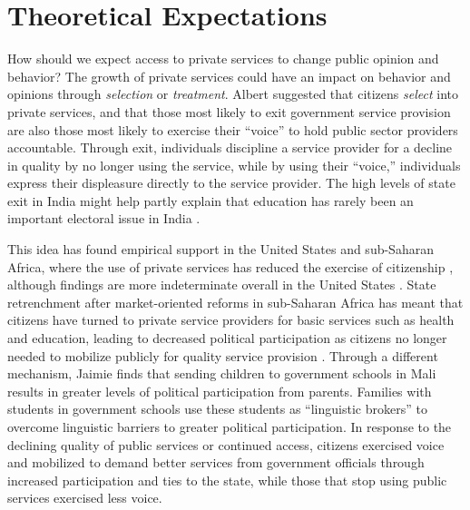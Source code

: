 \documentclass[hidelinks, 12pt, titlepage]{article}
\begin{document}
\section*{Theoretical Expectations\label{section:litreview}} 

	How should we expect access to private services to change public opinion and behavior?  The growth of private services could have an impact on behavior and opinions through \emph{selection} or \emph{treatment}.  Albert \cite{Hirschman1970} suggested that citizens \emph{select} into private services, and that those most likely to exit government service provision are also those most likely to exercise their ``voice'' to hold public sector providers accountable.  Through exit, individuals discipline a service provider for a decline in quality by no longer using the service, while by using their ``voice,'' individuals express their displeasure directly to the service provider.  The high levels of state exit in India might help partly explain that education has rarely been an important electoral issue in India \citep{Ansell2010,Rudolph1972,Rudra2002,Weiner1990}.

    This idea has found empirical support in the United States and sub-Saharan Africa, where the use of private services has reduced the exercise of citizenship \citep{Abernathy2005,Cook2020,MacLean2011}, although findings are more indeterminate overall in the United States \citep{DeAngelis2019, Dill2009, Kingsbury2019}.  State retrenchment after market-oriented reforms in sub-Saharan Africa has meant that citizens have turned to private service providers for basic services such as health and education, leading to decreased political participation as citizens no longer needed to mobilize publicly for quality service provision \citep{MacLean2011}.  Through a different mechanism, Jaimie \cite{Bleck2015} finds that sending children to government schools in Mali results in greater levels of political participation from parents.  Families with students in government schools use these students as ``linguistic brokers'' to overcome linguistic barriers to greater political participation. In response to the declining quality of public services or continued access, citizens exercised voice and mobilized to demand better services from government officials through increased participation and ties to the state, while those that stop using public services exercised less voice.
\end{document}
